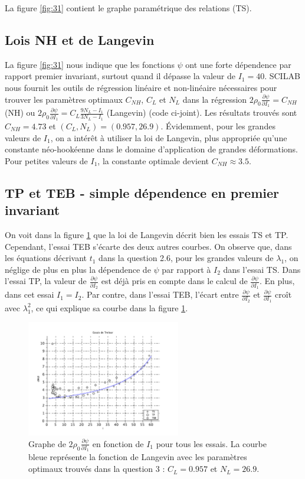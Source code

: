 \documentclass[a4paper,11pt]{article}
\begin{document}
La figure \ref{fig:31} contient le graphe paramétrique des relations (TS).

\subsection{Lois NH et de Langevin}
La figure \ref{fig:31} nous indique que les fonctions $\psi$ ont une forte dépendence par rapport premier invariant, surtout quand il dépasse la valeur de $I_1 = 40$. SCILAB nous fournit les outils de régression linéaire et non-linéaire nécessaires pour trouver les paramètres optimaux $C_{NH}$, $C_L$ et $N_L$ dans la régression $2 \rho_0 \frac{\partial\psi}{\partial I_1} = C_{NH}$ (NH) ou $2 \rho_0 \frac{\partial\psi}{\partial I_1} = C_L \frac{9N_L-I_1}{3N_L-I_1}$ (Langevin) (code ci-joint). Les résultats trouvés sont $C_{NH} = 4.73$ et $(C_L, N_L) = (0.957, 26.9)$. Évidemment, pour les grandes valeurs de $I_1$, on a intérêt à utiliser la loi de Langevin, plus appropriée qu'une constante néo-hookéenne dans le domaine d'application de grandes déformations. Pour petites valeurs de $I_1$, la constante optimale devient $C_{NH} \approx 3.5$.

\subsection{TP et TEB - simple dépendence en premier invariant}

On voit dans la figure \ref{fig:32} que la loi de Langevin décrit bien les essais TS et TP. Cependant, l'essai TEB s'écarte des deux autres courbes. On observe que, dans les équations décrivant $t_1$ dans la question 2.6, pour les grandes valeurs de $\lambda_1$, on néglige de plus en plus la dépendence de $\psi$ par rapport à $I_2$ dans l'essai TS. Dans l'essai TP, la valeur de $\frac{\partial\psi}{\partial I_2}$ est déjà pris en compte dans le calcul de $\frac{\partial\psi}{\partial I_1}$. En plus, dans cet essai $I_1 = I_2$. Par contre, dans l'essai TEB, l'écart entre $\frac{\partial\psi}{\partial I_2}$ et $\frac{\partial\psi}{\partial I_1}$ croît avec $\lambda_1^2$, ce qui explique sa courbe dans la figure \ref{fig:32}.

\begin{figure}[!ht]
\centering
\includegraphics[width=0.6\textwidth]{scilab_prof/q32.pdf}
\caption{Graphe de $2 \rho_0 \frac{\partial\psi}{\partial I_1}$ en fonction de $I_1$ pour tous les essais. La courbe bleue représente la fonction de Langevin avec les paramètres optimaux trouvés dans la question 3 : $C_L = 0.957$ et $N_L=26.9$.}
\label{fig:32}
\end{figure}
\end{document}
